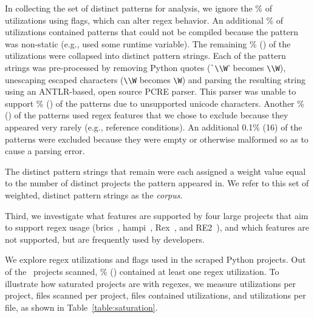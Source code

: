 In collecting the set of distinct patterns for analysis,  we ignore the \%  of utilizations using flags, which can alter regex behavior.  An additional \% of utilizations contained patterns that could not be compiled because the pattern was non-static (e.g., used some runtime variable).
The remaining \% () of the utilizations were collapsed into  distinct pattern strings.  Each of the pattern strings was pre-processed by removing Python quotes (\verb!`\\W!' becomes \verb!\\W!), unescaping escaped characters (\verb!\\W! becomes \verb!\W!) and parsing the resulting  string using an ANTLR-based, open source PCRE parser.
This parser was unable to support \% () of the patterns due to unsupported unicode characters.  Another \% () of the patterns used regex features that we  chose to exclude because they appeared very rarely (e.g., reference conditions).  An additional 0.1\% (16) of the patterns were excluded because they were empty or otherwise malformed so as to cause a parsing error.

The  distinct pattern strings that remain were each assigned a weight value equal to the number of distinct projects the pattern appeared in.  We  refer to this set of weighted, distinct pattern strings as the \emph{corpus}.

Third, we investigate what features are supported by four large projects that aim to support regex usage (brics~\cite{brics}, hampi~\cite{hampi}, Rex~\cite{rex}, and RE2~\cite{re2}), and which features are not supported, but are frequently used by developers.


We explore regex utilizations and flags used in the scraped Python projects.
Out of the \ projects scanned, \% () contained at least one regex utilization.  To illustrate how saturated projects are with regexes, we measure utilizations per project, files scanned per project, files contained utilizations, and  utilizations  per file, as shown in Table~\ref{table:saturation}.

